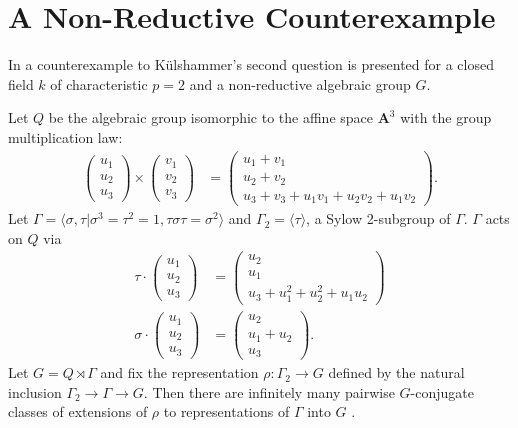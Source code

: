 \section{A Non-Reductive Counterexample}
In \cite{slodowy1997two} a counterexample to K\"ulshammer's second question is presented for a closed field $k$ of characteristic $p = 2$ and a non-reductive algebraic group $G$.
\begin{example} Let $Q$ be the algebraic group isomorphic to the affine space $\mathbf{A}^3$ with the group multiplication law:
\begin{align*}
	\left(\begin{matrix} u_1 \\ u_2 \\ u_3 \end{matrix}\right) \times
	\left(\begin{matrix} v_1 \\ v_2 \\ v_3 \end{matrix}\right) &=
	\left(\begin{matrix} u_1 + v_1 \\ u_2 + v_2 \\ u_3 + v_3 + u_1v_1 + u_2v_2 + u_1v_2 \end{matrix}\right).
\end{align*}
Let $\Gamma = \langle \sigma, \tau | \sigma^3 = \tau^2 = 1, \tau\sigma\tau = \sigma^2 \rangle$ and $\Gamma_2 = \langle \tau \rangle$, a Sylow 2-subgroup of $\Gamma$. $\Gamma$ acts on $Q$ via
\begin{align*}
	\tau \cdot \left(\begin{matrix} u_1 \\ u_2 \\ u_3 \end{matrix} \right) &=
	\left(\begin{matrix} u_2 \\ u_1 \\ u_3 + u_1^2 + u_2^2 + u_1u_2 \end{matrix} \right) \\
	\sigma \cdot \left(\begin{matrix} u_1 \\ u_2 \\ u_3 \end{matrix} \right) &=
	\left(\begin{matrix} u_2 \\ u_1 + u_2 \\ u_3 \end{matrix} \right).
\end{align*}
Let $G = Q \rtimes \Gamma$ and fix the representation $\rho:\Gamma_2 \rightarrow G$ defined by the natural inclusion $\Gamma_2 \rightarrow \Gamma \rightarrow G$. Then there are infinitely many pairwise $G$-conjugate classes of extensions of $\rho$ to representations of $\Gamma$ into $G$ \cite[Appendix]{slodowy1997two}.
\label{eg:non_red}
\end{example}
